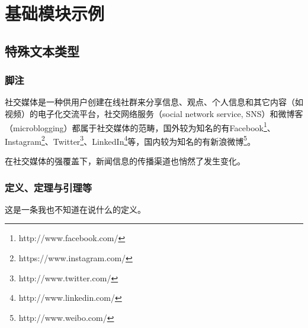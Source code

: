 \documentclass[a4paper,AutoFakeBold,oneside,12pt]{book}
\begin{document}
  
\newpage

  
\newpage

  
\newpage

 
\newpage

\frontmatter\tableofcontents %

\newpage\mainmatter
{} %
\pagestyle{fancy} %


\chapter{基础模块示例}


\section{特殊文本类型}
\subsection{脚注}
社交媒体是一种供用户创建在线社群来分享信息、观点、个人信息和其它内容（如视频）的电子化交流平台，社交网络服务（social network service, SNS）和微博客（microblogging）都属于社交媒体的范畴\cite{webster_social_media}，国外较为知名的有Facebook\footnote{http://www.facebook.com/}、Instagram\footnote{https://www.instagram.com/}、Twitter\footnote{http://www.twitter.com/}、LinkedIn\footnote{http://www.linkedin.com/}等，国内较为知名的有新浪微博\footnote{http://www.weibo.com/}。

在社交媒体的强覆盖下，新闻信息的传播渠道也悄然了发生变化。\cite{false_news_spread_2018}

\subsection{定义、定理与引理等}
\begin{definition}
这是一条我也不知道在说什么的定义。\cite{周兴2017基于深度学习的谣言检测及模式挖掘}
\end{definition}
\end{document}
